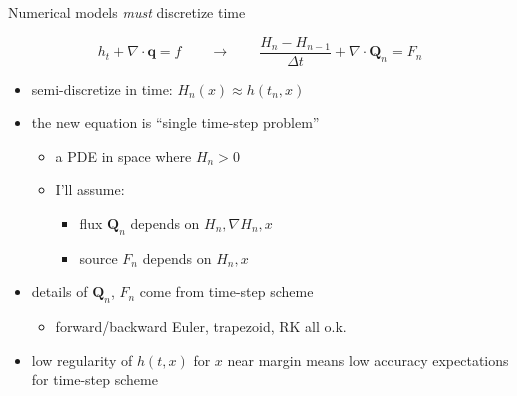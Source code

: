 \documentclass{beamer}
\newcommand\bq{\mathbf{q}}
\newcommand\bQ{\mathbf{Q}}
\newcommand{\Div}{\nabla\cdot}
\newcommand{\grad}{\nabla}
\begin{document}
\begin{frame}{Numerical models \emph{must} discretize time}

$$h_t + \Div\bq = f \qquad \to \qquad \frac{H_n - H_{n-1}}{\Delta t} + \Div \bQ_n = F_n$$

  \begin{itemize}
  \item semi-discretize in time: $H_n(x) \approx h(t_n,x)$
  \item<2-> the new equation is ``single time-step problem''
    \begin{itemize}
    \item<2->[$\circ$] a PDE in space \alert{where $H_n>0$}
    \item<2->[$\circ$] I'll assume:
       \begin{itemize}
       \item<2->[$\diamond$] flux $\bQ_n$ depends on $H_n,\grad H_n,x$
       \item<2->[$\diamond$] source $F_n$ depends on $H_n,x$
       \end{itemize}
    \end{itemize}
  \item<2-> details of $\bQ_n$, $F_n$ come from time-step scheme
    \begin{itemize}
    \item<2->[$\circ$] forward/backward Euler, trapezoid, RK all o.k.
    \end{itemize}
  \item<3> low regularity of $h(t,x)$ for $x$ near margin means low accuracy expectations for time-step scheme
  \end{itemize}
\end{frame}
\end{document}
